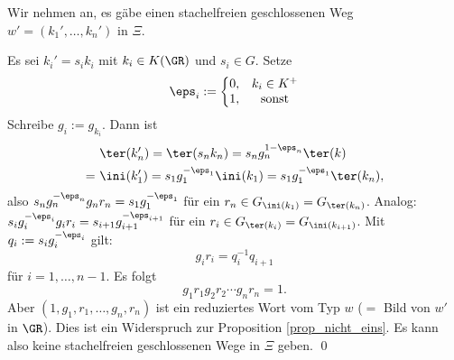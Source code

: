 \bew Wir nehmen an, es gäbe einen stachelfreien geschlossenen Weg
$w'=(k_1',\ldots,k_n')$ in $\Xi$.

Es sei $k_i' = s_i k_i$ mit $k_i \in K(\GR)$ und $s_i\in G$.
Setze
\[
\eps_i := \left\{
\begin{matrix}
0, & k_i \in K^+ \\
1, & \text{sonst}
\end{matrix}\right.
\]
Schreibe $g_i := g_{k_i}$. Dann ist
\begin{align*}
& \ter(k_n') = \ter(s_n k_n) = s_n g_n^{1-\eps_n} \ter(k) \\
=\ & \ini(k_1')=s_1 g_1^{-\eps_1}\ini(k_1)=s_1 g_1^{-\eps_1}\ter(k_n),
\end{align*}
also $s_n g_n^{-\eps_n} g_n r_n = s_1 g_1^{-\eps_1}$ für ein
$r_n \in G_{\ini(k_1)}=G_{\ter(k_n)}$.
Analog: $s_i g_i^{-\eps_i} g_i r_i = s_{i+1} g_{i+1}^{-\eps_{i+1}}$
für ein $r_i\in G_{\ter(k_i)}=G_{\ini(k_{i+1})}$.
Mit $q_i := s_i g_i^{-\eps_i}$ gilt:
\[
g_i r_i = q_i^{-1} q_{i+1}
\]
für $i=1,\ldots, n-1$.
Es folgt
\[
g_1 r_1 g_2 r_2 \cdots g_n r_n = 1.
\]
Aber $(1,g_1,r_1,\ldots,g_n,r_n)$ ist ein reduziertes Wort vom Typ
$w$ ($=$ Bild von $w'$ in $\GR$).
Dies ist ein Widerspruch zur Proposition \ref{prop_nicht_eins}.
Es kann also keine stachelfreien geschlossenen Wege in $\Xi$ geben.
\qed
